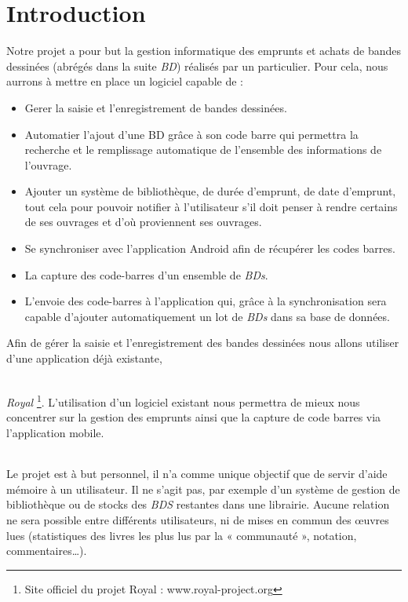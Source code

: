 \part*{Introduction}
Notre projet a pour but la gestion informatique des emprunts et achats de bandes dessinées (abrégés dans la suite \emph{BD}) réalisés par un particulier.
Pour cela, nous aurrons à mettre en place un logiciel capable de : 
\begin{itemize}
\item Gerer la saisie et l'enregistrement de bandes dessinées.
\item Automatier l'ajout d'une BD grâce à son code barre qui permettra la recherche et le remplissage automatique de l'ensemble des informations de l'ouvrage.
\item Ajouter un système de bibliothèque, de durée d'emprunt, de date d'emprunt, tout cela pour pouvoir notifier à l'utilisateur s'il doit penser à rendre certains de ses ouvrages et d'où proviennent ses ouvrages.
\item Se synchroniser avec l'application Android afin de récupérer les codes barres.
\end{itemize}

\begin{itemize}
\item La capture des code-barres d'un ensemble de \emph{BDs}.
\item L'envoie des code-barres à l'application qui, grâce à la synchronisation sera capable d'ajouter automatiquement un lot de \emph{BDs} dans sa base de données.
\end{itemize}

Afin de gérer la saisie et l'enregistrement des bandes dessinées nous allons utiliser d'une application déjà existante, 
\paragraph{}
\emph{Royal} \footnote{Site officiel du projet Royal : www.royal-project.org}. 
L'utilisation d'un logiciel existant nous permettra de mieux nous concentrer sur la gestion des emprunts ainsi que la capture de code barres via l'application mobile.

\paragraph{}
Le projet est à but personnel, il n'a comme unique objectif que de servir d'aide mémoire à un utilisateur.
Il ne s'agit pas, par exemple d'un système de gestion de bibliothèque ou de stocks des \emph{BDS} restantes dans une librairie.
Aucune relation ne sera possible entre différents utilisateurs, ni de mises en commun des œuvres lues
(statistiques des livres les plus lus par la « communauté », notation, commentaires…).
